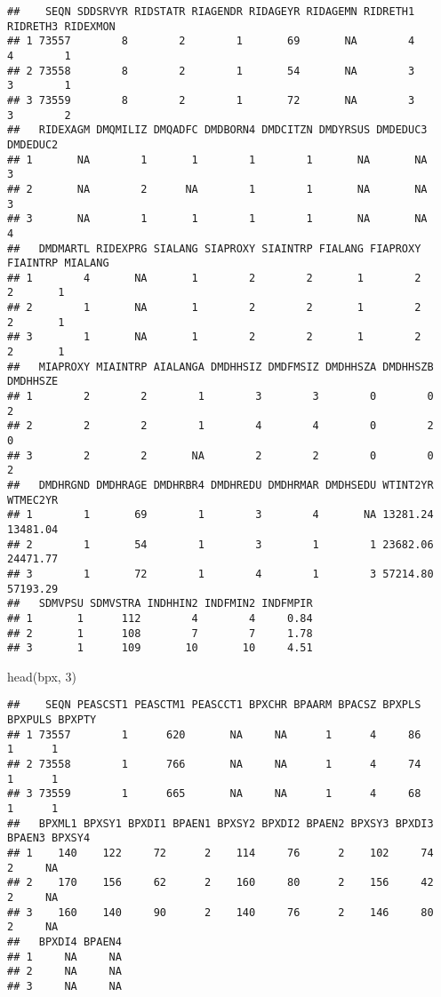 \documentclass[
]{book}
\newenvironment{Shaded}{\begin{snugshade}}{\end{snugshade}}
\newcommand{\DecValTok}[1]{\textcolor[rgb]{0.00,0.00,0.81}{#1}}
\newcommand{\FunctionTok}[1]{\textcolor[rgb]{0.00,0.00,0.00}{#1}}
\newcommand{\NormalTok}[1]{#1}
\begin{document}
\begin{verbatim}
##    SEQN SDDSRVYR RIDSTATR RIAGENDR RIDAGEYR RIDAGEMN RIDRETH1 RIDRETH3 RIDEXMON
## 1 73557        8        2        1       69       NA        4        4        1
## 2 73558        8        2        1       54       NA        3        3        1
## 3 73559        8        2        1       72       NA        3        3        2
##   RIDEXAGM DMQMILIZ DMQADFC DMDBORN4 DMDCITZN DMDYRSUS DMDEDUC3 DMDEDUC2
## 1       NA        1       1        1        1       NA       NA        3
## 2       NA        2      NA        1        1       NA       NA        3
## 3       NA        1       1        1        1       NA       NA        4
##   DMDMARTL RIDEXPRG SIALANG SIAPROXY SIAINTRP FIALANG FIAPROXY FIAINTRP MIALANG
## 1        4       NA       1        2        2       1        2        2       1
## 2        1       NA       1        2        2       1        2        2       1
## 3        1       NA       1        2        2       1        2        2       1
##   MIAPROXY MIAINTRP AIALANGA DMDHHSIZ DMDFMSIZ DMDHHSZA DMDHHSZB DMDHHSZE
## 1        2        2        1        3        3        0        0        2
## 2        2        2        1        4        4        0        2        0
## 3        2        2       NA        2        2        0        0        2
##   DMDHRGND DMDHRAGE DMDHRBR4 DMDHREDU DMDHRMAR DMDHSEDU WTINT2YR WTMEC2YR
## 1        1       69        1        3        4       NA 13281.24 13481.04
## 2        1       54        1        3        1        1 23682.06 24471.77
## 3        1       72        1        4        1        3 57214.80 57193.29
##   SDMVPSU SDMVSTRA INDHHIN2 INDFMIN2 INDFMPIR
## 1       1      112        4        4     0.84
## 2       1      108        7        7     1.78
## 3       1      109       10       10     4.51
\end{verbatim}

\begin{Shaded}
\begin{Highlighting}[]
\FunctionTok{head}\NormalTok{(bpx, }\DecValTok{3}\NormalTok{)}
\end{Highlighting}
\end{Shaded}

\begin{verbatim}
##    SEQN PEASCST1 PEASCTM1 PEASCCT1 BPXCHR BPAARM BPACSZ BPXPLS BPXPULS BPXPTY
## 1 73557        1      620       NA     NA      1      4     86       1      1
## 2 73558        1      766       NA     NA      1      4     74       1      1
## 3 73559        1      665       NA     NA      1      4     68       1      1
##   BPXML1 BPXSY1 BPXDI1 BPAEN1 BPXSY2 BPXDI2 BPAEN2 BPXSY3 BPXDI3 BPAEN3 BPXSY4
## 1    140    122     72      2    114     76      2    102     74      2     NA
## 2    170    156     62      2    160     80      2    156     42      2     NA
## 3    160    140     90      2    140     76      2    146     80      2     NA
##   BPXDI4 BPAEN4
## 1     NA     NA
## 2     NA     NA
## 3     NA     NA
\end{verbatim}
\end{document}
